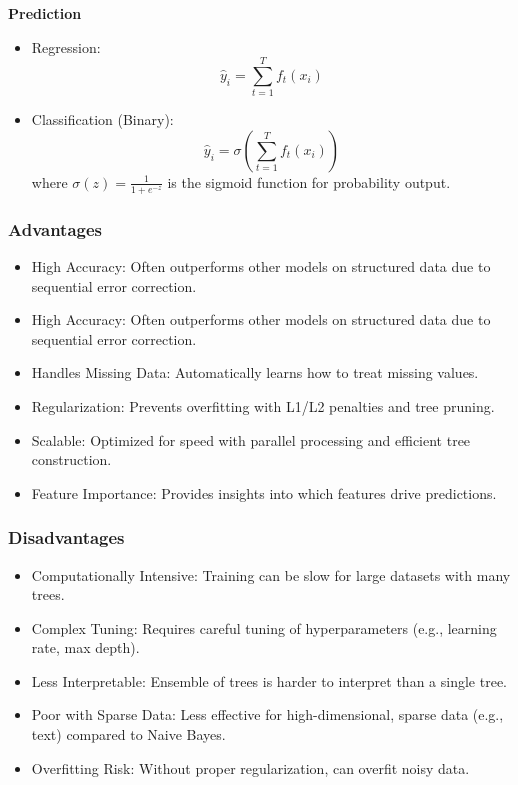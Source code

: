\textbf{Prediction}

\begin{itemize}
    \item Regression:
    \[
        \hat{y}_i = \sum_{t=1}^T f_t(x_i)
    \]

    \item Classification (Binary):
    \[
        \hat{y}_i = \sigma \left( \sum_{t=1}^T f_t(x_i) \right)
    \]
    where $\sigma(z) = \frac{1}{1+e^{-z}}$ is the sigmoid function for probability output.
\end{itemize}

\subsubsection{Advantages}
\begin{itemize}
    \item High Accuracy: Often outperforms other models on structured data due to sequential error correction.
    \item High Accuracy: Often outperforms other models on structured data due to sequential error correction.
    \item Handles Missing Data: Automatically learns how to treat missing values.
    \item Regularization: Prevents overfitting with L1/L2 penalties and tree pruning.
    \item Scalable: Optimized for speed with parallel processing and efficient tree construction.
    \item Feature Importance: Provides insights into which features drive predictions.
\end{itemize}

\subsubsection{Disadvantages}
\begin{itemize}
    \item Computationally Intensive: Training can be slow for large datasets with many trees.
    \item Complex Tuning: Requires careful tuning of hyperparameters (e.g., learning rate, max depth).
    \item Less Interpretable: Ensemble of trees is harder to interpret than a single tree.
    \item Poor with Sparse Data: Less effective for high-dimensional, sparse data (e.g., text) compared to Naive Bayes.
    \item Overfitting Risk: Without proper regularization, can overfit noisy data.
\end{itemize}